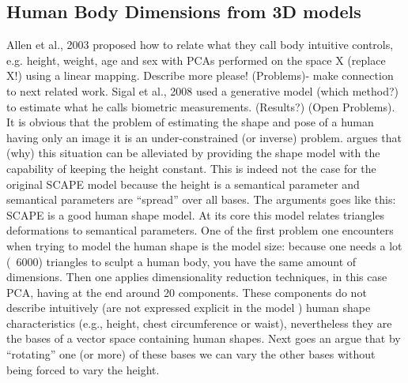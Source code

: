 \documentclass[runningheads, orivec]{llncs}
\begin{document}
\subsection{Human Body Dimensions from 3D models}
Allen et al., 2003 \cite{Allen.2003} proposed how to relate what they call body 
intuitive controls, e.g. height, weight, age and sex with PCAs performed on the 
space X (replace X!) using a linear mapping. Describe more please! (Problems)- 
make connection to next related work.  
Sigal et al., 2008 \cite{Sigal.2008} used a generative model (which method?) to 
estimate what he calls biometric measurements. (Results?) (Open Problems).
It is obvious that the problem of estimating the shape and pose of a human 
having only an image it is an under-constrained  (or inverse) problem. 
\cite{Guan.2013}  argues that (why) this situation can be alleviated by 
providing the shape model with the capability of keeping the height constant. 
This is indeed not the case for the original SCAPE model because the height is 
a semantical parameter and semantical parameters are “spread” over all bases. 
The arguments goes like this: SCAPE is a good human shape model. At its core 
this model relates triangles deformations to semantical parameters. One of the 
first problem one encounters when trying to model the human shape is the model 
size: because one needs a lot (~6000) triangles to sculpt a human body, you 
have the same amount of dimensions. Then one applies dimensionality reduction 
techniques, in this case PCA, having at the end around 20 components. These 
components do not describe intuitively (are not expressed explicit in the model 
) human shape characteristics (e.g., height, chest circumference or waist), 
nevertheless they are the bases of a vector space containing human shapes. Next 
\cite{Guan.2013} goes an argue that by “rotating” one (or more) of these bases 
we can vary the other bases  without being forced to vary the height.
\end{document}
